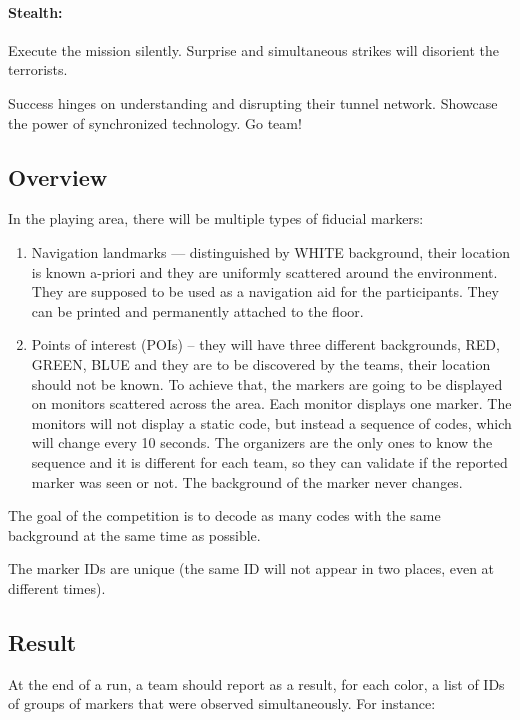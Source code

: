 \paragraph{Stealth:} Execute the mission silently. Surprise and simultaneous strikes will disorient the terrorists.

Success hinges on understanding and disrupting their tunnel network. Showcase the power of synchronized technology. Go team!


\subsection{Overview}

In the playing area, there will be multiple types of fiducial markers:

\begin{enumerate}
    \item Navigation landmarks — distinguished by WHITE background, their location is known a-priori and they are uniformly scattered around the environment. They are supposed to be used as a navigation aid for the participants. They can be printed and permanently attached to the floor.

    \item Points of interest (POIs) – they will have three different backgrounds, RED, GREEN, BLUE and they are to be discovered by the teams, their location should not be known. To achieve that, the markers are going to be displayed on monitors scattered across the area. Each monitor displays one marker. The monitors will not display a static code, but instead a sequence of codes, which will change every 10 seconds. The organizers are the only ones to know the sequence and it is different for each team, so they can validate if the reported marker was seen or not. The background of the marker never changes.
\end{enumerate}

The goal of the competition is to decode as many codes with the same background at the same time as possible. 


The marker IDs are unique (the same ID will not appear in two places, even at different times).

\subsection{Result}
At the end of a run, a team should report as a result, for each color, a list of IDs of groups of markers that were observed simultaneously. For instance:

